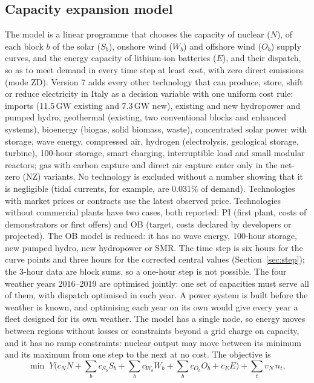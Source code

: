 \subsection{Capacity expansion model}\label{sec:model}
The model is a linear programme that chooses the capacity of nuclear ($N$), of each block $b$ of the solar ($S_b$), onshore wind ($W_b$) and offshore wind ($O_b$) supply curves, and the energy capacity of lithium-ion batteries ($E$), and their dispatch, so as to meet demand in every time step at least cost, with zero direct emissions (mode ZD). Version 7 adds every other technology that can produce, store, shift or reduce electricity in Italy as a decision variable with one uniform cost rule: imports (11.5\,GW existing and 7.3\,GW new), existing and new hydropower and pumped hydro, geothermal (existing, two conventional blocks and enhanced systems), bioenergy (biogas, solid biomass, waste), concentrated solar power with storage, wave energy, compressed air, hydrogen (electrolysis, geological storage, turbine), 100-hour storage, smart charging, interruptible load and small modular reactors; gas with carbon capture and direct air capture enter only in the net-zero (NZ) variants. No technology is excluded without a number showing that it is negligible (tidal currents, for example, are 0.031\% of demand). Technologies with market prices or contracts use the latest observed price. Technologies without commercial plants have two cases, both reported: PI (first plant, costs of demonstrators or first offers) and OB (target, costs declared by developers or projected). The OB model is reduced: it has no wave energy, 100-hour storage, new pumped hydro, new hydropower or SMR. The time step is six hours for the curve points and three hours for the corrected central values (Section~\ref{sec:step}); the 3-hour data are block sums, so a one-hour step is not possible. The four weather years 2016--2019 are optimised jointly: one set of capacities must serve all of them, with dispatch optimised in each year. A power system is built before the weather is known, and optimising each year on its own would give every year a fleet designed for its own weather. The model has a single node, so energy moves between regions without losses or constraints beyond a grid charge on capacity, and it has no ramp constraints: nuclear output may move between its minimum and its maximum from one step to the next at no cost. The objective is
\begin{equation}
\min \; Y\Big(c_N N + \sum_b c_{S_b} S_b + \sum_b c_{W_b} W_b + \sum_b c_{O_b} O_b + c_E E\Big) + \sum_{t} v_N\, n_t ,
\end{equation}
